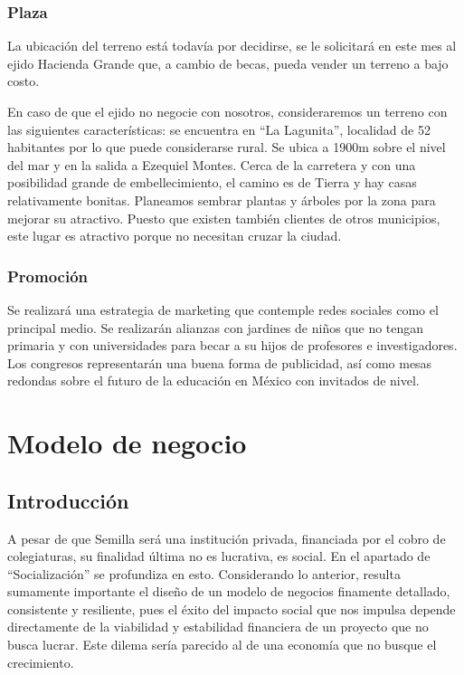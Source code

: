 \documentclass[10pt,letterpaper,oneside]{book}
\begin{document}
\subsection{Plaza}

La ubicación del terreno está todavía por decidirse, se le solicitará en este mes al ejido Hacienda Grande que, a cambio de becas, pueda vender un terreno a bajo costo.

En caso de que el ejido no negocie con nosotros, consideraremos un terreno con las siguientes características: se encuentra en ``La Lagunita'', localidad de 52 habitantes por lo que puede considerarse rural. Se ubica a  1900m sobre el nivel del mar y en la salida a Ezequiel Montes. Cerca de la carretera y con una posibilidad grande de embellecimiento, el camino es de Tierra y hay casas relativamente bonitas. Planeamos sembrar plantas y árboles por la zona para mejorar su atractivo. Puesto que existen también clientes de otros municipios, este lugar es atractivo porque no necesitan cruzar la ciudad.

\subsection{Promoción}
Se realizará una estrategia de marketing que contemple redes sociales como el principal medio. Se realizarán alianzas con jardines de niños que no tengan primaria y con universidades para becar a su hijos de profesores e investigadores. Los congresos representarán una buena forma de publicidad, así como mesas redondas sobre el futuro de la educación en México con invitados de nivel.


\chapter{Modelo de negocio}

\section{Introducción}
A pesar de que Semilla será una institución privada, financiada por el cobro de colegiaturas, su finalidad última no es lucrativa, es social. En el apartado de ``Socialización'' se profundiza en esto.  Considerando lo anterior, resulta sumamente importante el diseño de un modelo de negocios finamente detallado, consistente y resiliente, pues el éxito del impacto social que nos impulsa depende directamente de la viabilidad y estabilidad financiera de un proyecto que no busca lucrar. Este dilema sería parecido al de una economía que no busque el crecimiento.
\end{document}
